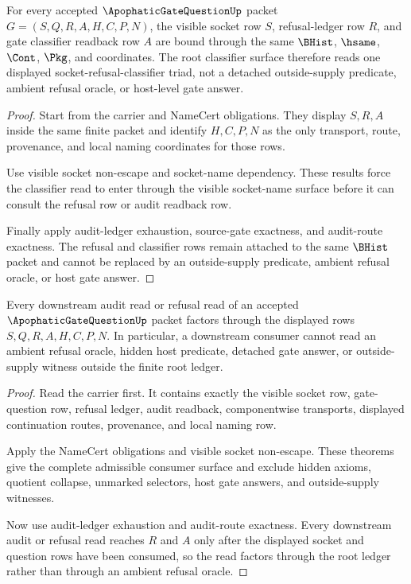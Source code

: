 \begin{theorem}
\label{thm:apophatic-gate-question-root-classifier-socket-triad}
For every accepted $\ApophaticGateQuestionUp$ packet $G=(S,Q,R,A,H,C,P,N)$, the visible socket row $S$, refusal-ledger row $R$, and gate classifier readback row $A$ are bound through the same $\BHist$, $\hsame$, $\Cont$, $\Pkg$, and \NameCert{} coordinates. The root classifier surface therefore reads one displayed socket-refusal-classifier triad, not a detached outside-supply predicate, ambient refusal oracle, or host-level gate answer.
\end{theorem}
\begin{proof}
Start from the carrier and NameCert obligations. They display $S,R,A$ inside the same finite packet and identify $H,C,P,N$ as the only transport, route, provenance, and local naming coordinates for those rows.

Use visible socket non-escape and socket-name dependency. These results force the classifier read to enter through the visible socket-name surface before it can consult the refusal row or audit readback row.

Finally apply audit-ledger exhaustion, source-gate exactness, and audit-route exactness. The refusal and classifier rows remain attached to the same $\BHist$ packet and cannot be replaced by an outside-supply predicate, ambient refusal oracle, or host gate answer.
\end{proof}

\begin{theorem}
\label{thm:apophatic-gate-question-root-ledger-factorization}
Every downstream audit read or refusal read of an accepted $\ApophaticGateQuestionUp$ packet factors through the displayed rows $S,Q,R,A,H,C,P,N$. In particular, a downstream consumer cannot read an ambient refusal oracle, hidden host predicate, detached gate answer, or outside-supply witness outside the finite root ledger.
\end{theorem}
\begin{proof}
Read the carrier first. It contains exactly the visible socket row, gate-question row, refusal ledger, audit readback, componentwise transports, displayed continuation routes, provenance, and local naming row.

Apply the NameCert obligations and visible socket non-escape. These theorems give the complete admissible consumer surface and exclude hidden axioms, quotient collapse, unmarked selectors, host gate answers, and outside-supply witnesses.

Now use audit-ledger exhaustion and audit-route exactness. Every downstream audit or refusal read reaches $R$ and $A$ only after the displayed socket and question rows have been consumed, so the read factors through the root ledger rather than through an ambient refusal oracle.
\end{proof}

